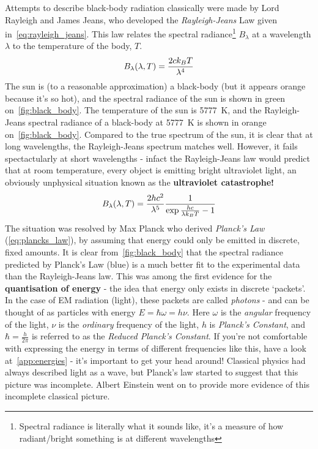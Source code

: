 \documentclass{memoir}[11pt,oneside,a4paper,openany]
\begin{document}
Attempts to describe black-body radiation classically were made by Lord Rayleigh and James Jeans, who developed the \emph{Rayleigh-Jeans} Law given in~\autoref{eq:rayleigh_jeans}. This law relates the spectral radiance\footnote{Spectral radiance is literally what it sounds like, it's a measure of how radiant/bright something is at different wavelengths} $B_\lambda$ at a wavelength $\lambda$ to the temperature of the body, $T$.
\begin{equation}\label{eq:rayleigh_jeans}
	\centering
	B_\lambda(\lambda,T) = \frac{2ck_B T}{\lambda^4}
\end{equation}
The sun is (to a reasonable approximation) a black-body (but it appears orange because it's so hot), and the spectral radiance of the sun is shown in green on~\autoref{fig:black_body}. The temperature of the sun is \SI{5777}{\kelvin}, and the Rayleigh-Jeans spectral radiance of a black-body at \SI{5777}{\kelvin} is shown in orange on~\autoref{fig:black_body}. Compared to the true spectrum of the sun, it is clear that at long wavelengths, the Rayleigh-Jeans spectrum matches well. However, it fails spectactularly at short wavelengths - infact the Rayleigh-Jeans law would predict that at room temperature, every object is emitting bright ultraviolet light, an obviously unphysical situation known as the \textbf{ultraviolet catastrophe!}
\begin{equation}\label{eq:plancks_law}
	\centering
	B_\lambda(\lambda, T) = \frac{2hc^2}{\lambda^5} \frac{1}{\exp{\frac{hc}{\lambda k_B T}}-1}
\end{equation}
The situation was resolved by Max Planck who derived \emph{Planck's Law} (\autoref{eq:plancks_law}), by assuming that energy could only be emitted in discrete, fixed amounts. It is clear from~\autoref{fig:black_body} that the spectral radiance predicted by Planck's Law (blue) is a much better fit to the experimental data than the Rayleigh-Jeans law. This was among the first evidence for the \textbf{quantisation of energy} - the idea that energy only exists in discrete `packets'. In the case of EM radiation (light), these packets are called \emph{photons} - and can be thought of as particles with energy $E= \hbar\omega = h\nu$. Here $\omega$ is the \emph{angular} frequency of the light, $\nu$ is the \emph{ordinary} frequency of the light, $h$ is \emph{Planck's Constant}, and $\hbar = \frac{h}{2\pi}$ is referred to as the \emph{Reduced Planck's Constant}. If you're not comfortable with expressing the energy in terms of different frequencies like this, have a look at~\autoref{app:energies} - it's important to get your head around! Classical physics had always described light as a wave, but Planck's law started to suggest that this picture was incomplete. Albert Einstein went on to provide more evidence of this incomplete classical picture.   
\end{document}
